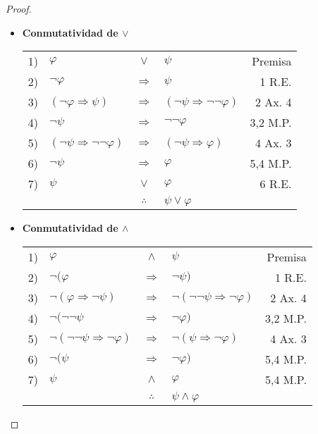 \documentclass[12pt]{report}
\newcounter{it}
\theoremstyle{largebreak}
\begin{document}
    \begin{proof}
        \begin{itemize}
            \item \textbf{Conmutatividad de $\lor$}
            \begin{center}
                \begin{tabular}{l l c l r}
                    1) & $\varphi$ & $\lor$ & $\psi$ & Premisa \\
                    2) & $\neg\varphi$ & $\Rightarrow$ & $\psi$ & 1 R.E. \\
                    3) & $(\neg\varphi\Rightarrow\psi)$ & $\Rightarrow$ & $(\neg\psi\Rightarrow\neg\neg\varphi)$ & 2 Ax. 4 \\
                    4) & $\neg\psi$ & $\Rightarrow$ & $\neg\neg\varphi$ & 3,2 M.P.\\
                    5) & $(\neg\psi\Rightarrow\neg\neg\varphi)$ & $\Rightarrow$ & $(\neg\psi\Rightarrow\varphi)$ & 4 Ax. 3 \\
                    6) & $\neg\psi$ & $\Rightarrow$ & $\varphi$ & 5,4 M.P. \\
                    7) & $\psi$ & $\lor$ & $\varphi$ & 6 R.E. \\
                    \hline
                    & & $\therefore$ & $\psi\lor\varphi$ & \\
                \end{tabular}
            \end{center}
            \item \textbf{Conmutatividad de $\land$}
            \begin{center}
                \begin{tabular}{l l c l r}
                    1) & $\varphi$ & $\land$ & $\psi$ & Premisa \\
                    2) & $\neg(\varphi$ & $\Rightarrow$ & $\neg\psi)$ & 1 R.E. \\
                    3) & $\neg(\varphi\Rightarrow\neg\psi)$ & $\Rightarrow$ & $\neg(\neg\neg\psi\Rightarrow\neg\varphi)$ & 2 Ax. 4 \\
                    4) & $\neg(\neg\neg\psi$ & $\Rightarrow$ & $\neg\varphi)$ & 3,2 M.P. \\
                    5) & $\neg(\neg\neg\psi\Rightarrow\neg\varphi)$ & $\Rightarrow$ & $\neg(\psi\Rightarrow\neg\varphi)$ & 4 Ax. 3 \\
                    6) & $\neg(\psi$ & $\Rightarrow$ & $\neg\varphi)$ & 5,4 M.P. \\
                    7) & $\psi$ & $\land$ & $\varphi$ & 5,4 M.P. \\
                    \hline
                    & & $\therefore$ & $\psi\land\varphi$ & \\
                \end{tabular}
            \end{center}
        \end{itemize}
    \end{proof}
\end{document}
